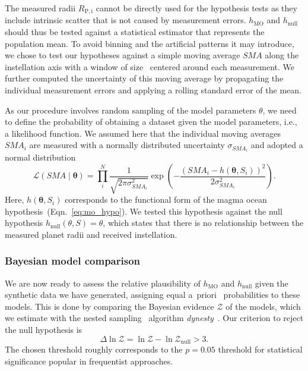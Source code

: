 \documentclass[modern]{aastex631}
\begin{document}
\begin{note}
The measured radii $R_\mathrm{P, i}$ cannot be directly used for the hypothesis tests as they include intrinsic scatter that is not caused by measurement errors.
$h_{\mathrm{MO}}$ and $h_{\mathrm{null}}$ should thus be tested against a statistical estimator that represents the population mean.
To avoid binning and the artificial patterns it may introduce, we chose to test our hypotheses against a simple moving average $SMA$ along the instellation axis with a window of size \windowsize\ centered around each measurement.
We further computed the uncertainty of this moving average by propagating the individual measurement errors and applying a rolling standard error of the mean. 

As our procedure involves random sampling of the model parameters $\theta$, we need to define the probability of obtaining a dataset given the model parameters, i.e., a likelihood function.
We assumed here that the individual moving averages $SMA_i$ are measured with a normally distributed uncertainty $\sigma_{SMA_i}$ and adopted a normal distribution
\begin{equation}
    \mathcal{L}(SMA \mid \boldsymbol{\theta})=\prod_{i}^{N} \frac{1}{\sqrt{2 \pi \sigma_{SMA_i}^{2}}} \exp \left(-\frac{\left(SMA_i - h\left(\boldsymbol{\theta}, S_i\right)\right)^{2}}{2 \sigma_{SMA_i}^{2}}\right).
\end{equation}
Here, $h\left(\boldsymbol{\theta}, S_i\right)$ corresponds to the functional form of the magma ocean hypothesis~(Eqn.~\ref{eq:mo_hypo}).
We tested this hypothesis against the null hypothesis $h_\mathrm{null} (\theta, S) = \theta$, which states that there is no relationship between the measured planet radii and received instellation.
\end{note}



\subsubsection{Bayesian model comparison}
We are now ready to assess the relative plausibility of $h_{\mathrm{MO}}$ and $h_{\mathrm{null}}$ given the synthetic data we have generated, assigning equal a~priori~ probabilities to these models.
This is done by comparing the Bayesian evidence $\mathcal{Z}$ of the models, which we estimate with the nested sampling~\citep{Skilling2004} algorithm \emph{dynesty}~\citep{Speagle2020}.
Our criterion to reject the null hypothesis is
\begin{equation}
\Delta \ln \mathcal{Z}  = \ln \mathcal{Z} - \ln \mathcal{Z}_\mathrm{null}  > 3.
\end{equation}
The chosen threshold roughly corresponds to the $p = 0.05$ threshold for statistical significance popular in frequentist approaches.
\end{document}
